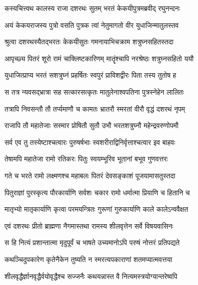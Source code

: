 

\twolineshloka
{कस्यचित्त्वथ कालस्य राजा दशरथः सुतम्}
{भरतं केकयीपुत्रमब्रवीद्  रघुनन्दनः} %

\twolineshloka
{अयं केकयराजस्य पुत्रो वसति पुत्रक}
{त्वां नेतुमागतो वीर युधाजिन्मातुलस्तव} %

\twolineshloka
{श्रुत्वा दशरथस्यैतद्भरतः केकयीसुतः}
{गमनायाभिचक्राम शत्रुघ्नसहितस्तदा} %

\twolineshloka
{आपृच्छ्य पितरं शूरो रामं चाक्लिष्टकारिणम्}
{मातॄंश्चापि नरश्रेष्ठः शत्रुघ्नसहितो ययौ} %

\twolineshloka
{युधाजित्प्राप्य भरतं सशत्रुघ्नं प्रहर्षितः}
{स्वपुरं प्राविशद्वीरः पिता तस्य तुतोष ह} %

\twolineshloka
{स तत्र न्यवसद्भ्रात्रा सह सत्कारसत्कृतः}
{मातुलेनाश्वपतिना पुत्रस्नेहेन लालितः} %

\twolineshloka
{तत्रापि निवसन्तौ तौ तर्प्यमाणौ च कामतः}
{भ्रातरौ स्मरतां वीरौ वृद्धं दशरथं नृपम्} %

\twolineshloka
{राजापि तौ महातेजाः सस्मार प्रोषितौ सुतौ}
{उभौ भरतशत्रुघ्नौ महेन्द्रवरुणोपमौ} %

\twolineshloka
{सर्व एव तु तस्येष्टाश्चत्वारः पुरुषर्षभाः}
{स्वशरीराद्विनिर्वृत्ताश्चत्वार इव बाहवः} %

\twolineshloka
{तेषामपि महातेजा रामो रतिकरः पितुः}
{स्वयम्भूरिव भूतानां बभूव गुणवत्तरः} %

\twolineshloka
{गते च भरते रामो लक्ष्मणश्च महाबलः}
{पितरं देवसङ्काशं पूजयामासतुस्तदा} %

\twolineshloka
{पितुराज्ञां पुरस्कृत्य पौरकार्याणि सर्वशः}
{चकार रामो धर्मात्मा प्रियाणि च हितानि च} %

\twolineshloka
{मातृभ्यो मातृकार्याणि कृत्वा परमयन्त्रितः}
{गुरूणां गुरुकार्याणि काले कालेऽन्ववैक्षत} %

\twolineshloka
{एवं दशरथः प्रीतो ब्राह्मणा नैगमास्तथा}
{रामस्य शीलवृत्तेन सर्वे विषयवासिनः} %

\twolineshloka
{स हि नित्यं प्रशान्तात्मा मृदुपूर्वं च भाषते}
{उच्यमानोऽपि परुषं नोत्तरं प्रतिपद्यते} %

\twolineshloka
{कथञ्चिदुपकारेण कृतेनैकेन तुष्यति}
{न स्मरत्यपकाराणां शतमप्यात्मवत्तया} %

\twolineshloka
{शीलवृद्धैर्ज्ञानवृद्धैर्वयोवृद्धैश्च सज्जनैः}
{कथयन्नास्त वै नित्यमस्त्रयोग्यान्तरेष्वपि} %

